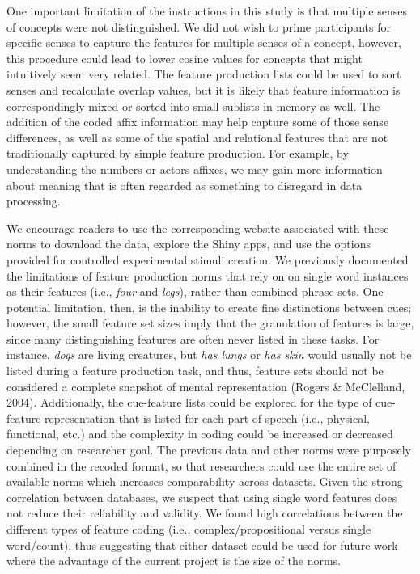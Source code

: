 \documentclass[english,,man]{apa6}
\begin{document}
One important limitation of the instructions in this study is that multiple senses of concepts were not distinguished. We did not wish to prime participants for specific senses to capture the features for multiple senses of a concept, however, this procedure could lead to lower cosine values for concepts that might intuitively seem very related. The feature production lists could be used to sort senses and recalculate overlap values, but it is likely that feature information is correspondingly mixed or sorted into small sublists in memory as well. The addition of the coded affix information may help capture some of those sense differences, as well as some of the spatial and relational features that are not traditionally captured by simple feature production. For example, by understanding the numbers or actors affixes, we may gain more information about meaning that is often regarded as something to disregard in data processing.

We encourage readers to use the corresponding website associated with these norms to download the data, explore the Shiny apps, and use the options provided for controlled experimental stimuli creation. We previously documented the limitations of feature production norms that rely on on single word instances as their features (i.e., \emph{four} and \emph{legs}), rather than combined phrase sets. One potential limitation, then, is the inability to create fine distinctions between cues; however, the small feature set sizes imply that the granulation of features is large, since many distinguishing features are often never listed in these tasks. For instance, \emph{dogs} are living creatures, but \emph{has lungs} or \emph{has skin} would usually not be listed during a feature production task, and thus, feature sets should not be considered a complete snapshot of mental representation (Rogers \& McClelland, 2004). Additionally, the cue-feature lists could be explored for the type of cue-feature representation that is listed for each part of speech (i.e., physical, functional, etc.) and the complexity in coding could be increased or decreased depending on researcher goal. The previous data and other norms were purposely combined in the recoded format, so that researchers could use the entire set of available norms which increases comparability across datasets. Given the strong correlation between databases, we suspect that using single word features does not reduce their reliability and validity. We found high correlations between the different types of feature coding (i.e., complex/propositional versus single word/count), thus suggesting that either dataset could be used for future work where the advantage of the current project is the size of the norms.
\end{document}
